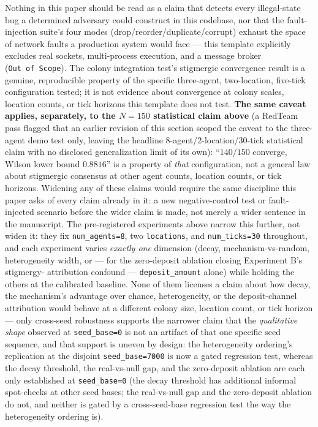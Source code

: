 \documentclass[
  english,
]{article}
\theoremstyle{definition}
\begin{document}
Nothing in this paper should be read as a claim that
 detects every illegal-state bug a determined
adversary could construct in this codebase, nor that the fault-injection
suite's four modes (drop/reorder/duplicate/corrupt) exhaust the space of
network faults a production system would face --- this template
explicitly excludes real sockets, multi-process execution, and a message
broker (\texttt{Out\ of\ Scope}). The colony integration test's
stigmergic convergence result is a genuine, reproducible property of the
specific three-agent, two-location, five-tick configuration tested; it
is not evidence about convergence at colony scales, location counts, or
tick horizons this template does not test. \textbf{The same caveat
applies, separately, to the \(N=150\) statistical claim above} (a
RedTeam pass flagged that an earlier revision of this section scoped the
caveat to the three-agent demo test only, leaving the headline
\(8\)-agent/\(2\)-location/\(30\)-tick statistical claim with no
disclosed generalization limit of its own): ``\(140/150\) converge,
Wilson lower bound \(0.8816\)'' is a property of \emph{that}
configuration, not a general law about stigmergic consensus at other
agent counts, location counts, or tick horizons. Widening any of these
claims would require the same discipline this paper asks of every claim
already in it: a new negative-control test or fault-injected scenario
before the wider claim is made, not merely a wider sentence in the
manuscript. The pre-registered experiments above narrow this further,
not widen it: they fix \texttt{num\_agents=8}, two \texttt{locations},
and \texttt{num\_ticks=30} throughout, and each experiment varies
\emph{exactly one} dimension (decay, mechanism-vs-random, heterogeneity
width, or --- for the zero-deposit ablation closing Experiment B's
stigmergy- attribution confound --- \texttt{deposit\_amount} alone)
while holding the others at the calibrated baseline. None of them
licenses a claim about how decay, the mechanism's advantage over chance,
heterogeneity, or the deposit-channel attribution would behave at a
different colony size, location count, or tick horizon --- only
cross-seed robustness supports the narrower claim that the
\emph{qualitative shape} observed at \texttt{seed\_base=0} is not an
artifact of that one specific seed sequence, and that support is uneven
by design: the heterogeneity ordering's replication at the disjoint
\texttt{seed\_base=7000} is now a gated regression test, whereas the
decay threshold, the real-vs-null gap, and the zero-deposit ablation are
each only established at \texttt{seed\_base=0} (the decay threshold has
additional informal spot-checks at other seed bases; the real-vs-null
gap and the zero-deposit ablation do not, and neither is gated by a
cross-seed-base regression test the way the heterogeneity ordering is).
\end{document}
